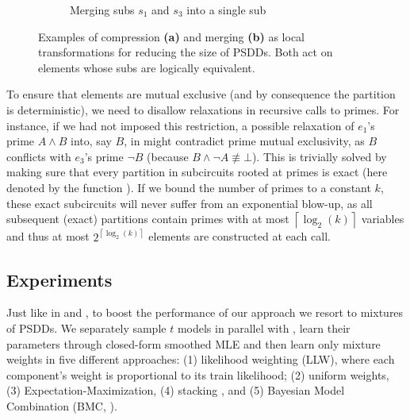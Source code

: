 \begin{figure}[t]
\begin{subfigure}{\textwidth}
    \caption{Merging subs $s_1$ and $s_3$ into a single sub}
    \label{fig:merge}
  \end{subfigure}
  \caption{Examples of compression \textbf{(a)} and merging \textbf{(b)} as local transformations
    for reducing the size of PSDDs. Both act on elements whose subs are logically equivalent.}
  \label{fig:compmerge}
\end{figure}

To ensure that elements are mutual exclusive (and by consequence the partition is deterministic),
we need to disallow relaxations in recursive calls to primes. For instance, if we had not imposed
this restriction, a possible relaxation of $e_1$'s prime $A\wedge B$ into, say $B$, in
 might contradict prime mutual exclusivity, as $B$ conflicts with $e_3$'s prime
$\neg B$ (because $B\wedge\neg A\not\equiv\bot$). This is trivially solved by making sure that
every partition in subcircuits rooted at primes is exact (here denoted by the function
). If we bound the number of primes to a constant $k$, these exact
subcircuits will never suffer from an exponential blow-up, as all subsequent (exact) partitions
contain primes with at most $\left\lceil\log_2(k)\right\rceil$ variables and thus at most
$2^{\left\lceil\log_2(k)\right\rceil}$ elements are constructed at each call.

\subsection{Experiments}

Just like in  and , to boost the performance of our approach
we resort to mixtures of PSDDs. We separately sample $t$ models in parallel with
, learn their parameters through closed-form smoothed MLE \citep{kisa14} and
then learn only mixture weights in five different approaches: (1) likelihood weighting (LLW), where
each component's weight is proportional to its train likelihood; (2) uniform weights, (3)
Expectation-Maximization, (4) stacking \citep{smyth98}, and (5) Bayesian Model Combination (BMC,
\cite{monteith11}).

